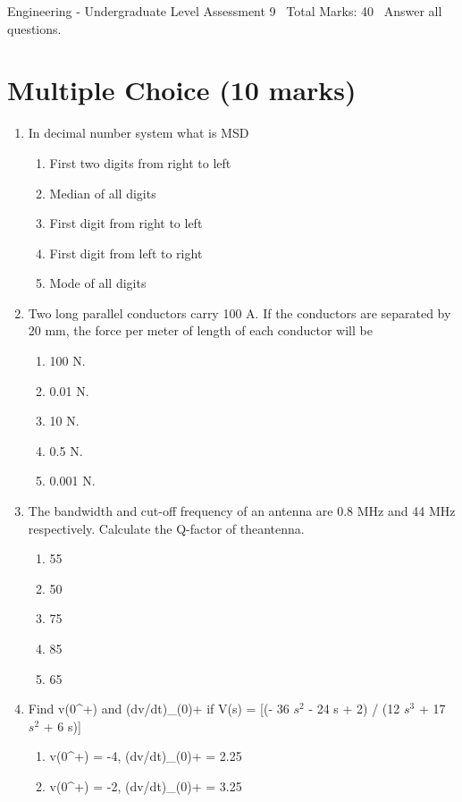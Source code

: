 \documentclass[12pt]{article}
\begin{document}
\begin{center}
Engineering - Undergraduate Level Assessment 9 \
Total Marks: 40 \
Answer all questions.
\end{center}

\section*{Multiple Choice (10 marks)}
\begin{enumerate}[label=\arabic*.]
\item In decimal number system what is MSD
\begin{enumerate}[label=(\alph*)]
    \item First two digits from right to left
    \item Median of all digits
    \item First digit from right to left
    \item First digit from left to right
    \item Mode of all digits
\end{enumerate}
\item Two long parallel conductors carry 100 A. If the conductors are separated by 20 mm, the force per meter of length of each conductor will be
\begin{enumerate}[label=(\alph*)]
    \item 100 N.
    \item 0.01 N.
    \item 10 N.
    \item 0.5 N.
    \item 0.001 N.
\end{enumerate}
\item The bandwidth and cut-off frequency of an antenna are 0.8 MHz and 44 MHz respectively. Calculate the Q-factor of theantenna.
\begin{enumerate}[label=(\alph*)]
    \item 55
    \item 50
    \item 75
    \item 85
    \item 65
\end{enumerate}
\item Find v(0^+) and (dv/dt)\_(0)+ if V(s) = [(- 36 $s^2$ - 24 s + 2) / (12 $s^3$ + 17 $s^2$ + 6 s)]
\begin{enumerate}[label=(\alph*)]
    \item v(0^+) = -4, (dv/dt)\_(0)+ = 2.25
    \item v(0^+) = -2, (dv/dt)\_(0)+ = 3.25

\end{enumerate}
\end{enumerate}
\end{document}
